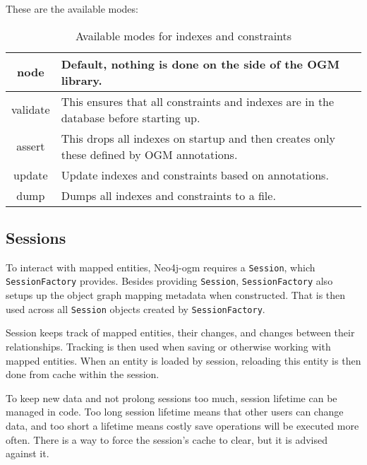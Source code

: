 These are the available modes:
\begin{table}[H]
    \begin{center}
        \begin{tabularx}{\textwidth}{|c|p{}|}
            \hline
            node     & Default, nothing is done on the side of the OGM library.                                  \\
            \hline
            validate & This ensures that all constraints and indexes are in the database before starting up.     \\
            \hline
            assert   & This drops all indexes on startup and then creates only these defined by OGM annotations. \\
            \hline
            update   & Update indexes and constraints based on annotations.                                      \\
            \hline
            dump     & Dumps all indexes and constraints to a file.                                              \\
            \hline
        \end{tabularx}
        \caption{Available modes for indexes and constraints}
    \end{center}
\end{table}

\subsection{Sessions}
To interact with mapped entities, Neo4j-\acrshort{ogm} requires a \texttt{Session}, which \texttt{SessionFactory} provides. Besides providing \texttt{Session}, \texttt{SessionFactory}
also setups up the object graph mapping metadata when constructed. That is then used across all \texttt{Session} objects created by \texttt{SessionFactory}.

Session keeps track of mapped entities, their changes, and changes between their relationships. Tracking is then used when saving or otherwise
working with mapped entities. When an entity is loaded by session, reloading this entity is then done from cache within the session.

To keep new data and not prolong sessions too much, session lifetime can be managed in code. Too long session lifetime
means that other users can change data, and too short a lifetime means costly save operations will be executed more often. There is a way
to force the session's cache to clear, but it is advised against it.

